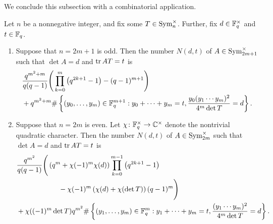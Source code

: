 We conclude this subsection with a combinatorial application.
\begin{corollary} \label{cor:count-sym}
    Let $n$ be a nonnegative integer, and fix some $T\in\operatorname{Sym}_n^\times$. Further, fix $d\in\mathbb F_q^\times$ and $t\in\mathbb F_q$.
    \begin{enumerate}[label=(\alph*)]
        \item Suppose that $n=2m+1$ is odd. Then the number $N(d,t)$ of $A\in\operatorname{Sym}_{2m+1}^\times$ such that $\det A=d$ and $\operatorname{tr} AT=t$ is
        \begin{align*}
            &\frac{q^{m^2+m}}{q(q-1)}\Bigg(\prod_{k=0}^m\left(q^{2k+1}-1\right)-(q-1)^{m+1}\Bigg) \\
            &+q^{m^2+m}\#\left\{(y_0,\ldots,y_m)\in\mathbb F_q^{m+1}:y_0+\cdots+y_m=t,\frac{y_0(y_1\cdots y_m)^2}{4^m\det T}=d\right\}.
        \end{align*}
        \item Suppose that $n=2m$ is even. Let $\chi\colon\mathbb F_q^\times\to\mathbb C^\times$ denote the nontrivial quadratic character. Then the number $N(d,t)$ of $A\in\operatorname{Sym}_{2m}^\times$ such that $\det A=d$ and $\operatorname{tr} AT=t$ is
        \begin{align*}
            &\frac{q^{m^2}}{q(q-1)}\Bigg(\left(q^m+\chi(-1)^m\chi(d)\right)\prod_{k=0}^{m-1}\left(q^{2k+1}-1\right) \\
            & \qquad\qquad\qquad-\chi(-1)^m\left(\chi(d)+\chi(\det T)\right)(q-1)^m\Bigg) \\
            &+\chi((-1)^m\det T)q^{m^2}\#\left\{(y_1,\ldots,y_m)\in\mathbb F_q^m:y_1+\cdots+y_m=t,\frac{(y_1\cdots y_m)^2}{4^m\det T}=d\right\}.
        \end{align*}
    \end{enumerate}
\end{corollary}

